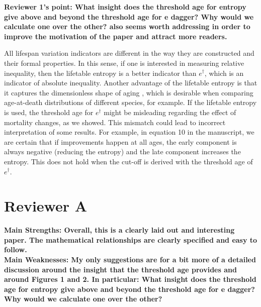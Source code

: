 \documentclass[a4paper,twoside, openright, 12pt, leqno]{article}
\begin{document}
\newpage
\textbf{Reviewer 1’s point: What insight does the threshold age for entropy give above and beyond the threshold age for e dagger? Why would we calculate one over the other? also seems worth addressing in order to improve the motivation of the paper and attract more readers.} \linebreak



All lifespan variation indicators are different in the way they are constructed and their formal properties. In this sense, if one is interested in measuring relative inequality, then the lifetable entropy is a better indicator than $e^\dagger$, which is an indicator of absolute inequality. Another advantage of the lifetable entropy is that it captures the dimensionless shape of aging \citep{colchero2016emergence}, which is desirable when comparing age-at-death distributions of different species, for example. If the lifetable entropy is used, the threshold age for $e^\dagger$ might be misleading regarding the effect of mortality changes, as we showed. This mismatch could lead to incorrect interpretation of some results. For example, in equation 10 in the manuscript, we are certain that if improvements happen at all ages, the early component is always negative (reducing the entropy) and the late component increases the entropy. This does not hold when the cut-off is derived with the threshold age of $e^\dagger$.


\section*{Reviewer A}
\textbf{Main Strengths:
Overall, this is a clearly laid out and interesting paper. The mathematical relationships are clearly specified and easy to follow.} \\

\textbf{Main Weaknesses:
My only suggestions are for a bit more of a detailed discussion around the insight that the threshold age provides and around Figures 1 and 2. In particular: What insight does the threshold age for entropy give above and beyond the threshold age for e dagger? Why would we calculate one over the other? }\linebreak
\end{document}
